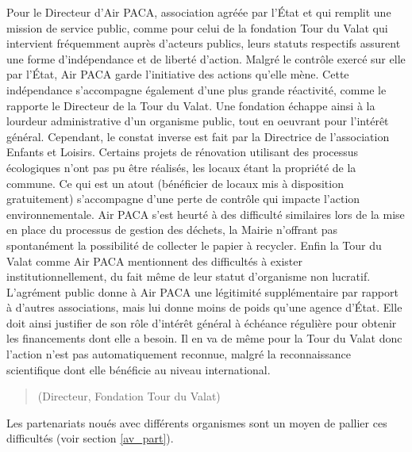         Pour le Directeur d'Air PACA, association agréée par l'État et qui remplit une mission de service public, comme pour celui de la fondation Tour du Valat qui intervient fréquemment auprès d'acteurs publics, leurs statuts respectifs assurent une forme d'indépendance et de liberté d'action. Malgré le contrôle exercé sur elle par l'État, Air PACA garde l'initiative des actions qu'elle mène. Cette indépendance s'accompagne également d'une plus grande réactivité, comme le rapporte le Directeur de la Tour du Valat. Une fondation échappe ainsi à la lourdeur administrative d'un organisme public, tout en oeuvrant pour l'intérêt général. Cependant, le constat inverse est fait par la Directrice de l'association Enfants et Loisirs. Certains projets de rénovation utilisant des processus écologiques n'ont pas pu être réalisés, les locaux étant la propriété de la commune. Ce qui est un atout (bénéficier de locaux mis à disposition gratuitement) s'accompagne d'une perte de contrôle qui impacte l'action environnementale. Air PACA s'est heurté à des difficulté similaires lors de la mise en place du processus de gestion des déchets, la Mairie n'offrant pas spontanément la possibilité de collecter le papier à recycler. Enfin la Tour du Valat comme Air PACA mentionnent des difficultés à exister institutionnellement, du fait même de leur statut d'organisme non lucratif. L'agrément public donne à Air PACA une légitimité supplémentaire par rapport à d'autres associations, mais lui donne moins de poids qu'une agence d'État. Elle doit ainsi justifier de son rôle d'intérêt général à échéance régulière pour obtenir les financements dont elle a besoin. Il en va de même pour la Tour du Valat donc l'action n'est pas automatiquement reconnue, malgré la reconnaissance scientifique dont elle bénéficie au niveau international.
        \begin{quotation}
             (Directeur, Fondation Tour du Valat)
        \end{quotation}
        Les partenariats noués avec différents organismes sont un moyen de pallier ces difficultés (voir section \ref{av_part}).

